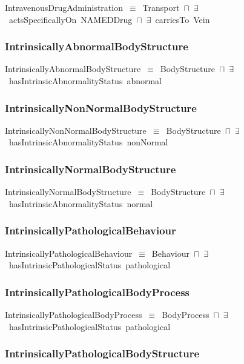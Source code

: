 \documentclass{article}
\begin{document}
IntravenousDrugAdministration~\ensuremath{\equiv}~Transport~\ensuremath{\sqcap}~\ensuremath{\exists}~actsSpecificallyOn~NAMEDDrug~\ensuremath{\sqcap}~\ensuremath{\exists}~carriesTo~Vein

\subsubsection*{IntrinsicallyAbnormalBodyStructure}

IntrinsicallyAbnormalBodyStructure~\ensuremath{\equiv}~BodyStructure~\ensuremath{\sqcap}~\ensuremath{\exists}~hasIntrinsicAbnormalityStatus~abnormal

\subsubsection*{IntrinsicallyNonNormalBodyStructure}

IntrinsicallyNonNormalBodyStructure~\ensuremath{\equiv}~BodyStructure~\ensuremath{\sqcap}~\ensuremath{\exists}~hasIntrinsicAbnormalityStatus~nonNormal

\subsubsection*{IntrinsicallyNormalBodyStructure}

IntrinsicallyNormalBodyStructure~\ensuremath{\equiv}~BodyStructure~\ensuremath{\sqcap}~\ensuremath{\exists}~hasIntrinsicAbnormalityStatus~normal

\subsubsection*{IntrinsicallyPathologicalBehaviour}

IntrinsicallyPathologicalBehaviour~\ensuremath{\equiv}~Behaviour~\ensuremath{\sqcap}~\ensuremath{\exists}~hasIntrinsicPathologicalStatus~pathological

\subsubsection*{IntrinsicallyPathologicalBodyProcess}

IntrinsicallyPathologicalBodyProcess~\ensuremath{\equiv}~BodyProcess~\ensuremath{\sqcap}~\ensuremath{\exists}~hasIntrinsicPathologicalStatus~pathological

\subsubsection*{IntrinsicallyPathologicalBodyStructure}
\end{document}
